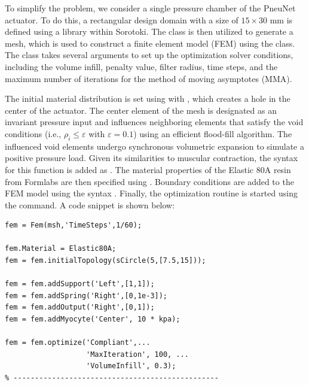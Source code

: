 To simplify the problem, we consider a single pressure chamber of the PneuNet actuator. To do this, a rectangular design domain with a size of $15 \times 30$ \si{\milli \meter} is defined using a  library within Sorotoki. The  class is then utilized to generate a mesh, which is used to construct a finite element model (FEM) using the  class. The  class takes several arguments to set up the optimization solver conditions, including the volume infill, penalty value, filter radius, time steps, and the maximum number of iterations for the method of moving asymptotes (MMA).

%
%
The initial material distribution is set using  with , which creates a hole in the center of the actuator. The center element of the mesh is designated as an invariant pressure input and influences neighboring elements that satisfy the void conditions (i.e., $\rho_i \le \varepsilon$ with $\varepsilon = 0.1$) using an efficient flood-fill algorithm. The influenced void elements undergo synchronous volumetric expansion to simulate a positive pressure load. Given its similarities to muscular contraction, the syntax for this function is added as . The material properties of the Elastic 80A resin from Formlabs are then specified using . Boundary conditions are added to the FEM model using the syntax . Finally, the optimization routine is started using the  command. A code snippet is shown below:

\begin{lstlisting}[style=matlab] 
% ------------------------------------------------
fem = Fem(msh,'TimeSteps',1/60);

fem.Material = Elastic80A;
fem = fem.initialTopology(sCircle(5,[7.5,15]));

fem = fem.addSupport('Left',[1,1]);
fem = fem.addSpring('Right',[0,1e-3]);
fem = fem.addOutput('Right',[0,1]);
fem = fem.addMyocyte('Center', 10 * kpa);

fem = fem.optimize('Compliant',... 
                   'MaxIteration', 100, ...
                   'VolumeInfill', 0.3);
% ------------------------------------------------
\end{lstlisting}

